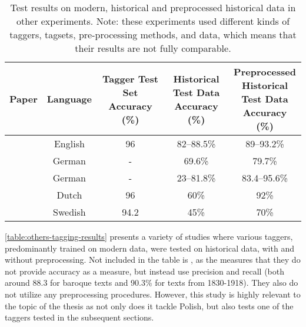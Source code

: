 \begin{table*}[h]
\begin{center}
\begin{tabular}{|l|cccc|}
\hline \bf Paper & \bf Language & \bf \makecell[c]{Tagger Test Set \\ Accuracy (\%)} & \bf \makecell[c]{Historical \\ Test Data \\ Accuracy (\%)} & \bf \makecell[c]{Preprocessed \\ Historical \\ Test Data \\ Accuracy (\%)} \\ \hline
\citet{rayson07} & English & 96 & 82--88.5\% & 89--93.2\% \\
\citet{scheible11} & German & - & 69.6\% & 79.7\% \\
\citet{bollmann-2013-pos} & German & - & 23--81.8\% & 83.4--95.6\% \\
\citet{hupkes16} & Dutch & 96 & 60\% & 92\% \\
\citet{adesam-bouma-2016-old} & Swedish & 94.2\footnotemark & 45\% & 70\% \\
\hline
\end{tabular}
\end{center}
\caption{\label{table:others-tagging-results} Test results on modern, historical and preprocessed historical data in other experiments. Note: these experiments used different kinds of taggers, tagsets, pre-processing methods, and data, which means that their results are not fully comparable.}
\end{table*}

\autoref{table:others-tagging-results} presents a variety of studies where various taggers, predominantly trained on modern data, were tested on historical data, with and without preprocessing. Not included in the table is \citet{waszczuk2018morphosyntactic}, as the measures that they do not provide accuracy as a measure, but instead use precision and recall (both around 88.3 for baroque texts and 90.3\% for texts from 1830-1918). They also do not utilize any preprocessing procedures. However, this study is highly relevant to the topic of the thesis as not only does it tackle Polish, but also tests one of the taggers tested in the subsequent sections. 

